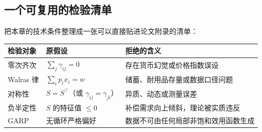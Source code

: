 \subsection{一个可复用的检验清单}

把本章的技术条件整理成一张可以直接贴进论文附录的清单：

\begin{center}
\begin{tabular}{lll}
\toprule
检验对象 & 原假设 & 拒绝的含义\\
\midrule
零次齐次 & $\sum_j\gamma_{ij}=0$ & 存在货币幻觉或价格指数误设\\
Walras 律 & $\sum_ip_ix_i=w$ & 储蓄、耐用品存量或数据口径问题\\
对称性 & $S=S^{\top}$（或 $\gamma_{ij}=\gamma_{ji}$） & 异质、动态或测量误差\\
负半定性 & $S$ 的特征值 $\le0$ & 补偿需求向上倾斜，理论被实质违反\\
GARP & 无循环严格偏好 & 数据不可由任何局部非饱和效用函数生成\\
\bottomrule
\end{tabular}
\end{center}
